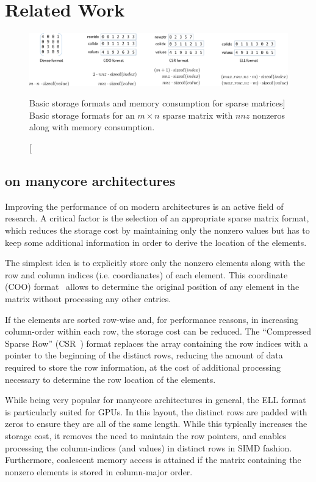 \section{Related Work}
\label{2017-batched-spmv:sec:related}


\begin{figure}[t]
\centering
\includegraphics[width=\columnwidth]{plots/formats}
\caption
[Basic storage formats and memory consumption for sparse matrices]
{Basic storage formats for an $m\times n$ sparse matrix with $nnz$
    nonzeros along with memory consumption.}
\label{2017-batched-spmv:fig:formatoverview}
\end{figure}

\subsection{\spmv on manycore architectures}

Improving the performance of \spmv on modern architectures is an active field of research. 
A critical factor is the selection of an appropriate
sparse matrix format, which reduces the storage cost by maintaining only the nonzero values
but has to keep some additional information in order to derive the location of the elements.

The simplest idea is to explicitly store only the nonzero elements
along with the row and column indices (i.e. coordianates) of each element.
This coordinate (COO)
format~\cite{barrettemplates} allows to determine the original position of any element
in the matrix without processing any other entries.

If the elements are sorted row-wise and, for performance reasons,
in increasing column-order within each row,
the storage cost can be reduced.
The ``Compressed Sparse Row'' (CSR~\cite{barrettemplates})
format
replaces the array containing the row indices with a pointer to the beginning 
of the distinct rows, reducing the amount of data required to store the row
information, at the cost of
additional processing necessary to determine the row location of the elements.

While being very
popular for manycore architectures in general, the ELL format~\cite{garlandspmv}
is particularly suited for GPUs.
In this layout, the distinct rows are padded with zeros to ensure
they are all of the same length.
While this typically increases the storage cost, 
it removes the need to maintain the row pointers,
and enables processing the column-indices (and values) in distinct
rows in SIMD fashion. Furthermore,
coalescent memory access is attained if the matrix containing
the nonzero elements
is stored in column-major order.

